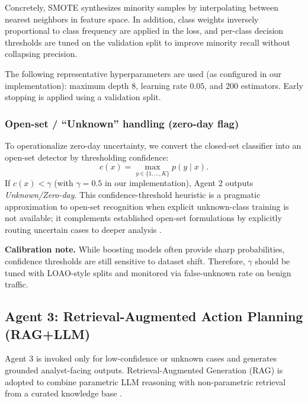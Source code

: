 \documentclass[conference]{IEEEtran}
\begin{document}
Concretely, SMOTE synthesizes minority samples by interpolating between nearest neighbors in feature space. In addition, class weights inversely proportional to class frequency are applied in the loss, and per-class decision thresholds are tuned on the validation split to improve minority recall without collapsing precision.

The following representative hyperparameters are used (as configured in our implementation): maximum depth $8$, learning rate $0.05$, and $200$ estimators. Early stopping is applied using a validation split.

\subsubsection{Open-set / ``Unknown'' handling (zero-day flag)}
To operationalize zero-day uncertainty, we convert the closed-set classifier into an open-set detector by thresholding confidence:
\begin{equation}
 c(x) = \max_{y\in\{1,\dots,K\}} p(y\mid x).
\end{equation}
If $c(x) < \gamma$ (with $\gamma=0.5$ in our implementation), Agent 2 outputs \emph{Unknown/Zero-day}. This confidence-threshold heuristic is a pragmatic approximation to open-set recognition when explicit unknown-class training is not available; it complements established open-set formulations by explicitly routing uncertain cases to deeper analysis \cite{Scheirer2013OpenSet,Bendale2016OpenMax}.

\textbf{Calibration note.} While boosting models often provide sharp probabilities, confidence thresholds are still sensitive to dataset shift. Therefore, $\gamma$ should be tuned with LOAO-style splits and monitored via false-unknown rate on benign traffic.

\subsection{Agent 3: Retrieval-Augmented Action Planning (RAG+LLM)}
\label{sec:agent3_method}

Agent 3 is invoked only for low-confidence or unknown cases and generates grounded analyst-facing outputs. Retrieval-Augmented Generation (RAG) is adopted to combine parametric LLM reasoning with non-parametric retrieval from a curated knowledge base \cite{Lewis2020RAG}.
\end{document}
